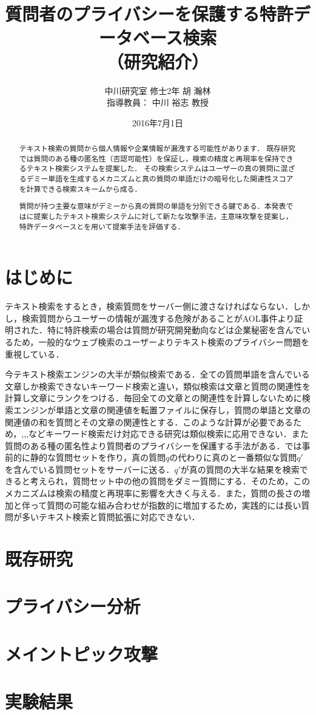 \documentclass{jsarticle}
\title{質問者のプライバシーを保護する特許データベース検索 \\（研究紹介）}
\author{中川研究室 修士2年 胡 瀚林\\指導教員： 中川 裕志 教授}
\date{2016年7月1日}
\theoremstyle{definition}
\begin{document}
\maketitle
\begin{abstract}
テキスト検索の質問から個人情報や企業情報が漏洩する可能性があります．
既存研究\cite{pang_embellishing_2010}では質問のある種の匿名性（否認可能性）を保証し，検索の精度と再現率を保持できるテキスト検索システムを提案した．
その検索システムはユーザーの真の質問に混ざるデミー単語を生成するメカニズムと真の質問の単語だけの暗号化した関連性スコアを計算できる検索スキームから成る．

質問が持つ主要な意味がデミーから真の質問の単語を分別できる鍵である．本発表では\cite{pang_embellishing_2010}に提案したテキスト検索システムに対して新たな攻撃手法，主意味攻撃を提案し，特許データベースとを用いて提案手法を評価する．
\end{abstract}

\section{はじめに}
テキスト検索をするとき，検索質問をサーバー側に渡さなければならない．しかし，検索質問からユーザーの情報が漏洩する危険があることがAOL事件\cite{_face_2006}より証明された．特に特許検索の場合は質問が研究開発動向などは企業秘密を含んでいるため，一般的なウェブ検索のユーザーよりテキスト検索のプライバシー問題を重視している．

今テキスト検索エンジンの大半が類似検索である．全ての質問単語を含んでいる文章しか検索できないキーワード検索と違い，類似検索は文章と質問の関連性を計算し文章にランクをつける\cite{zobel_inverted_2006}．毎回全ての文章との関連性を計算しないために検索エンジンが単語と文章の関連値を転置ファイルに保存し，質問の単語と文章の関連値の和を質問とその文章の関連性とする．このような計算が必要であるため，\cite{bethencourt_new_2006},\cite{freedman_keyword_2005},\cite{boneh_public_2004},\cite{song_practical_2000}などキーワード検索だけ対応できる研究は類似検索に応用できない．また質問のある種の匿名性より質問者のプライバシーを保護する手法がある．\cite{murugesan_providing_2009}では事前的に静的な質問セットを作り，真の質問$q$の代わりに真のと一番類似な質問$q'$を含んでいる質問セットをサーバーに送る．$q'$が真の質問の大半な結果を検索できると考えられ，質問セット中の他の質問をダミー質問にする．そのため，このメカニズムは検索の精度と再現率に影響を大きく与える．また，質問の長さの増加と伴って質問の可能な組み合わせが指数的に増加するため，実践的には長い質問が多いテキスト検索\cite{}と質問拡張\cite{qiu_concept_1993,xu_query_1996}に対応できない．
\section{既存研究}

\section{プライバシー分析}

\section{メイントピック攻撃}

\section{実験結果}



\end{document}
